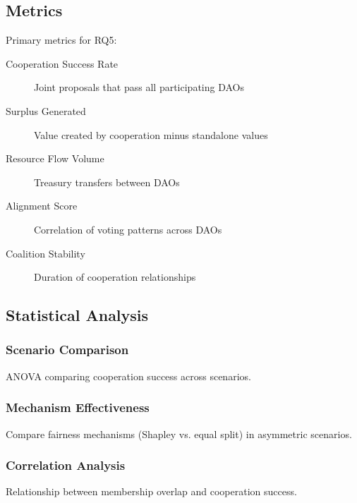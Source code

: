 \subsection{Metrics}

Primary metrics for RQ5:

\begin{description}
    \item[Cooperation Success Rate] Joint proposals that pass all participating DAOs
    \item[Surplus Generated] Value created by cooperation minus standalone values
    \item[Resource Flow Volume] Treasury transfers between DAOs
    \item[Alignment Score] Correlation of voting patterns across DAOs
    \item[Coalition Stability] Duration of cooperation relationships
\end{description}

\subsection{Statistical Analysis}

\subsubsection{Scenario Comparison}

ANOVA comparing cooperation success across scenarios.

\subsubsection{Mechanism Effectiveness}

Compare fairness mechanisms (Shapley vs. equal split) in asymmetric scenarios.

\subsubsection{Correlation Analysis}

Relationship between membership overlap and cooperation success.
